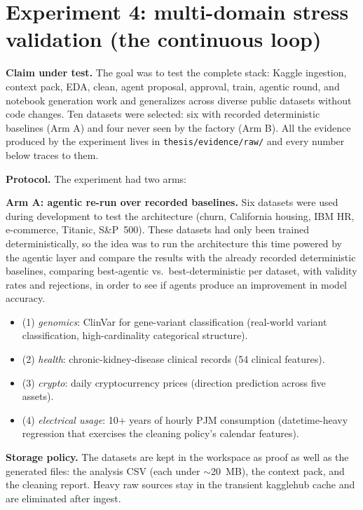 \section{Experiment 4: multi-domain stress validation (the continuous loop)}
\label{sec:exp-kaggle}

\textbf{Claim under test.} The goal was to test the complete stack: Kaggle ingestion, context pack, EDA, clean, agent proposal, approval, train, agentic round, and notebook generation work and generalizes across diverse public datasets without code changes. Ten datasets were selected: six with recorded deterministic baselines (Arm A) and four never seen by the factory (Arm B). All the evidence produced by the experiment lives in \texttt{thesis/evidence/raw/} and every number below traces to them.

\textbf{Protocol.} The experiment had two arms:

\textbf{Arm A: agentic re-run over recorded baselines.} Six datasets were used during development to test the architecture (churn, California housing, IBM HR, e-commerce, Titanic, S\&P~500). These datasets had only been trained deterministically, so the idea was to run the architecture this time powered by the agentic layer and compare the results with the already recorded deterministic baselines, comparing best-agentic vs.\ best-deterministic per dataset, with validity rates and rejections, in order to see if agents produce an improvement in model accuracy.


\begin{itemize}
	\item (1) \emph{genomics}: ClinVar for gene-variant classification (real-world variant classification, high-cardinality categorical structure).
	\item (2) \emph{health}: chronic-kidney-disease clinical records (54 clinical features).
	\item (3) \emph{crypto}: daily cryptocurrency prices (direction prediction across five assets).
	\item (4) \emph{electrical usage}: 10+ years of hourly PJM consumption (datetime-heavy regression that exercises the cleaning policy's calendar features).
\end{itemize}


\textbf{Storage policy.} The datasets are kept in the workspace as proof as well as the generated files: the analysis CSV (each under $\sim$20~MB), the context pack, and the cleaning report. Heavy raw sources stay in the transient kagglehub cache and are eliminated after ingest.

